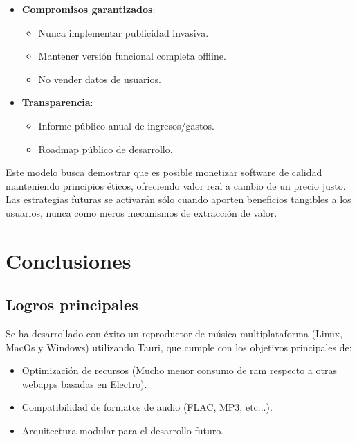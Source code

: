 \documentclass[11pt, a4paper]{article}
\begin{document}
  \begin{itemize}
    \item \textbf{Compromisos garantizados}:
      \begin{itemize}
        \item Nunca implementar publicidad invasiva.
        \item Mantener versión funcional completa offline.
        \item No vender datos de usuarios.
      \end{itemize}

    \item \textbf{Transparencia}:
      \begin{itemize}
        \item Informe público anual de ingresos/gastos.
        \item Roadmap público de desarrollo.
      \end{itemize}
  \end{itemize}

  Este modelo busca demostrar que es posible monetizar software de calidad manteniendo principios éticos, ofreciendo valor real a cambio de un precio justo. Las estrategias futuras se activarán sólo cuando aporten beneficios tangibles a los usuarios, nunca como meros mecanismos de extracción de valor.

\section{Conclusiones}

        \subsection{Logros principales}

        Se ha desarrollado con éxito un reproductor de música multiplataforma (Linux, MacOs y Windows) utilizando Tauri, que cumple con los objetivos principales de:

        \begin{itemize}
            \item Optimización de recursos (Mucho menor consumo de ram respecto a otras webapps basadas en Electro).
            \item Compatibilidad de formatos de audio (FLAC, MP3, etc...).
            \item Arquitectura modular para el desarrollo futuro.
        \end{itemize}
\end{document}
